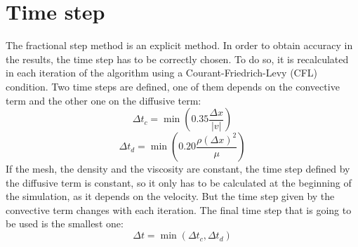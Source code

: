 \section{Time step}
The fractional step method is an explicit method. In order to obtain accuracy in the results, the time step has to be correctly chosen. To do so, it is recalculated in each iteration of the algorithm using a Courant-Friedrich-Levy (CFL) condition. Two time steps are defined, one of them depends on the convective term and the other one on the diffusive term:
\begin{equation}
\Delta t_{c}=\min\left(0.35\frac{\Delta x}{|v|}\right)
\end{equation}
\begin{equation}
\Delta t_{d}=\min\left(0.20\frac{\rho\left(\Delta x\right)^{2}}{\mu}\right)
\end{equation}
If the mesh, the density and the viscosity are constant, the time step defined by the diffusive term is constant, so it only has to be calculated at the beginning of the simulation, as it depends on the velocity. But the time step given by the convective term changes with each iteration. The final time step that is going to be used is the smallest one:
\begin{equation}
\Delta t=\min\left(\Delta t_{c}, \Delta t_{d}\right)
\end{equation}